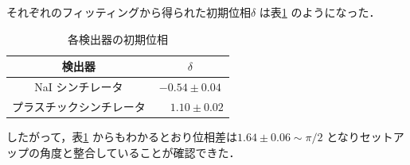 それぞれのフィッティングから得られた初期位相$\delta$ は表\ref{tab:InitPhases} のようになった．

\begin{table}[h]
	\centering
	\caption{各検出器の初期位相}
	\begin{tabular}{cc}\toprule
	検出器 & $\delta$ \\ \midrule
	NaI シンチレータ & $-0.54 \pm 0.04$ \\
	プラスチックシンチレータ & $\phantom{-}1.10 \pm 0.02$ \\ \bottomrule
	\end{tabular}\label{tab:InitPhases}
\end{table}%
したがって，表\ref{tab:InitPhases} からもわかるとおり位相差は$1.64 \pm 0.06 \sim \pi / 2$ となりセットアップの角度と整合していることが確認できた．
%
